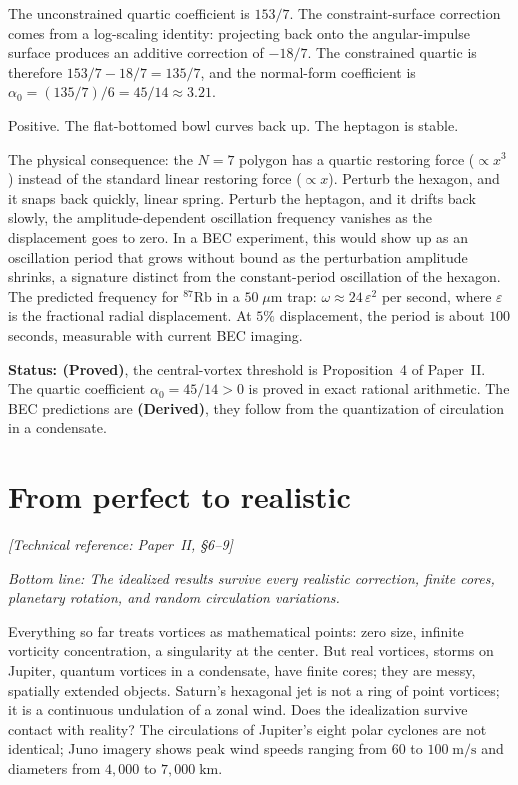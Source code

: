 The unconstrained quartic coefficient is $153/7$. The constraint-surface
correction comes from a log-scaling identity: projecting back onto the
angular-impulse surface produces an additive correction of $-18/7$. The
constrained quartic is therefore $153/7 - 18/7 = 135/7$, and the
normal-form coefficient is $\alpha_0 = (135/7)/6 = 45/14 \approx 3.21$.

Positive. The flat-bottomed bowl curves back up. The heptagon is stable.

The physical consequence: the $N = 7$ polygon has a quartic restoring
force ($\propto x^3$) instead of the standard linear restoring force
($\propto x$). Perturb the hexagon, and it snaps back quickly, linear
spring. Perturb the heptagon, and it drifts back slowly, the
amplitude-dependent oscillation frequency vanishes as the displacement
goes to zero. In a BEC experiment, this would show up as an oscillation
period that grows without bound as the perturbation amplitude shrinks, a
signature distinct from the constant-period oscillation of the hexagon.
The predicted frequency for $^{87}$Rb in a $50\;\mu\text{m}$ trap:
$\omega \approx 24\,\varepsilon^2$ per second, where $\varepsilon$ is
the fractional radial displacement. At $5\%$ displacement, the period
is about $100$ seconds, measurable with current BEC imaging.

\textbf{Status: (Proved)}, the central-vortex threshold is
Proposition~4 of Paper~II. The quartic coefficient
$\alpha_0 = 45/14 > 0$ is proved in exact rational arithmetic.
The BEC predictions are \textbf{(Derived)}, they follow from the
quantization of circulation in a condensate.


\section{From perfect to realistic}
\noindent\textit{[Technical reference: Paper~II, \S6--9]}

\medskip

\noindent\textit{Bottom line: The idealized results survive every
realistic correction, finite cores, planetary rotation, and random
circulation variations.}

\medskip

Everything so far treats vortices as mathematical points: zero size,
infinite vorticity concentration, a singularity at the center. But
real vortices, storms on Jupiter, quantum vortices in a
condensate, have finite cores; they are messy, spatially extended
objects. Saturn's hexagonal jet is not a ring of point vortices; it
is a continuous undulation of a zonal wind. Does the idealization
survive contact with reality? The circulations of
Jupiter's eight polar cyclones are not identical; Juno imagery shows
peak wind speeds ranging from $60$ to $100\;\text{m/s}$ and diameters
from $4{,}000$ to $7{,}000\;\text{km}$.

